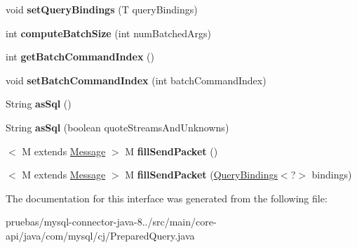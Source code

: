 \begin{DoxyCompactItemize}
void {\bfseries set\+Query\+Bindings} (T query\+Bindings)
\item 
\mbox{\label{interfacecom_1_1mysql_1_1cj_1_1_prepared_query_a2f8a64855253f9a463c37617651d8efd}} 
int {\bfseries compute\+Batch\+Size} (int num\+Batched\+Args)
\item 
\mbox{\label{interfacecom_1_1mysql_1_1cj_1_1_prepared_query_a6259e5fb4022b601291d1761d8989b28}} 
int {\bfseries get\+Batch\+Command\+Index} ()
\item 
\mbox{\label{interfacecom_1_1mysql_1_1cj_1_1_prepared_query_accf6ed5e5f4c11b08004265529ea0975}} 
void {\bfseries set\+Batch\+Command\+Index} (int batch\+Command\+Index)
\item 
\mbox{\label{interfacecom_1_1mysql_1_1cj_1_1_prepared_query_ac2538d056fb63b9b41286a424bb712c1}} 
String {\bfseries as\+Sql} ()
\item 
\mbox{\label{interfacecom_1_1mysql_1_1cj_1_1_prepared_query_a9e0ad2ee67b2f5622e8c2498261dda22}} 
String {\bfseries as\+Sql} (boolean quote\+Streams\+And\+Unknowns)
\item 
\mbox{\label{interfacecom_1_1mysql_1_1cj_1_1_prepared_query_aa466e879cf875af6ddbd571940192eac}} 
$<$ M extends \mbox{\hyperlink{interfacecom_1_1mysql_1_1cj_1_1protocol_1_1_message}{Message}} $>$ M {\bfseries fill\+Send\+Packet} ()
\item 
\mbox{\label{interfacecom_1_1mysql_1_1cj_1_1_prepared_query_aab23700381df4cf13e7f1801ff0024c2}} 
$<$ M extends \mbox{\hyperlink{interfacecom_1_1mysql_1_1cj_1_1protocol_1_1_message}{Message}} $>$ M {\bfseries fill\+Send\+Packet} (\mbox{\hyperlink{interfacecom_1_1mysql_1_1cj_1_1_query_bindings}{Query\+Bindings}}$<$?$>$ bindings)
\end{DoxyCompactItemize}


The documentation for this interface was generated from the following file\+:\begin{DoxyCompactItemize}
\item 
pruebas/mysql-\/connector-\/java-\/8../src/main/core-\/api/java/com/mysql/cj/Prepared\+Query.\+java\end{DoxyCompactItemize}
